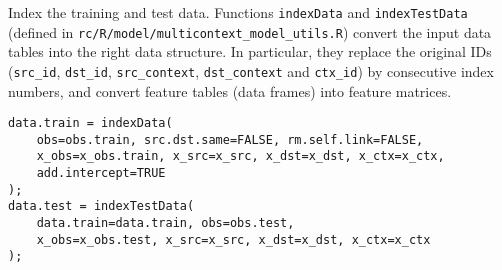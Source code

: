 \documentclass[10pt]{article}
\newcommand{\parahead}[1]{\vspace{0.15in}\noindent{\bf #1:}}
\begin{document}
\begin{comment}
Read training and test observation tables ({\tt obs.train} and {\tt obs.test}), their corresponding observation feature tables ({\tt x\_obs.train} and {\tt x\_obs.test}), the source feature table ({\tt x\_src}), the destination feature table ({\tt x\_dst}) and the edge context feature table ({\tt x\_ctx}) from the corresponding files.  Note that if you replace these tables with your data, you must not change the column names.
{\small\begin{verbatim}
input.dir = "test-data/multicontext_model/simulated-mtx-uvw-10K"
obs.train = read.table(paste(input.dir,"/obs-train.txt",sep=""), 
            sep="\t", header=FALSE, as.is=TRUE);
names(obs.train) = c("src_id", "dst_id", "src_context", 
                     "dst_context", "ctx_id", "y");
x_obs.train = read.table(paste(input.dir,"/dense-feature-obs-train.txt",
              sep=""), sep="\t", header=FALSE, as.is=TRUE);
obs.test = read.table(paste(input.dir,"/obs-test.txt",sep=""), 
           sep="\t", header=FALSE, as.is=TRUE);
names(obs.test) = c("src_id", "dst_id", "src_context", 
                    "dst_context", "ctx_id", "y");
x_obs.test = read.table(paste(input.dir,"/dense-feature-obs-test.txt",
             sep=""), sep="\t", header=FALSE, as.is=TRUE);
x_src = read.table(paste(input.dir,"/dense-feature-user.txt",sep=""),
        sep="\t", header=FALSE, as.is=TRUE);
names(x_src)[1] = "src_id";
x_dst = read.table(paste(input.dir,"/dense-feature-item.txt",sep=""),
        sep="\t", header=FALSE, as.is=TRUE);
names(x_dst)[1] = "dst_id";
x_ctx = read.table(paste(input.dir,"/dense-feature-ctxt.txt",sep=""),
        sep="\t", header=FALSE, as.is=TRUE);
names(x_ctx)[1] = "ctx_id";
\end{verbatim}}
\end{comment}
\parahead{Step 2} Index the training and test data.  Functions {\tt indexData} and {\tt indexTestData} (defined in {\tt rc/R/model/multicontext\_model\_utils.R}) convert the input data tables into the right data structure.  In particular, they replace the original IDs ({\tt src\_id}, {\tt dst\_id}, {\tt src\_context}, {\tt dst\_context} and {\tt ctx\_id}) by consecutive index numbers, and convert feature tables (data frames) into feature matrices.
{\small\begin{verbatim}
data.train = indexData(
    obs=obs.train, src.dst.same=FALSE, rm.self.link=FALSE,
    x_obs=x_obs.train, x_src=x_src, x_dst=x_dst, x_ctx=x_ctx,
    add.intercept=TRUE
);
data.test = indexTestData(
    data.train=data.train, obs=obs.test,
    x_obs=x_obs.test, x_src=x_src, x_dst=x_dst, x_ctx=x_ctx
);
\end{verbatim}}
\end{document}
